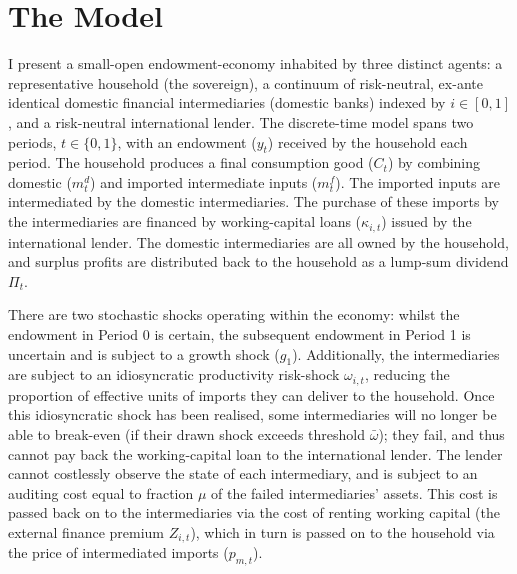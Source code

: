 \documentclass[11pt]{article}
\theoremstyle{definition}
\theoremstyle{plain}
\theoremstyle{remark}
\begin{document}
\section{The Model} \label{sec:environment}

I present a small-open endowment-economy inhabited by three distinct agents: a representative household (the sovereign), a continuum of risk-neutral, ex-ante identical domestic financial intermediaries (domestic banks) indexed by $i \in [0,1]$, and a risk-neutral international lender. The discrete-time model spans two periods, $t \in \{0,1\}$, with an endowment ($y_{t}$) received by the household each period. The household produces a final consumption good ($C_t$) by combining domestic ($m^d_t$) and imported intermediate inputs ($m^f_t$). The imported inputs are intermediated by the domestic intermediaries. The purchase of these imports by the intermediaries are financed by working-capital loans ($\kappa_{i,t}$) issued by the international lender. The domestic intermediaries are all owned by the household, and surplus profits are distributed back to the household as a lump-sum dividend $\Pi_t$. 

There are two stochastic shocks operating within the economy: whilst the endowment in Period 0 is certain, the subsequent endowment in Period 1 is uncertain and is subject to a growth shock ($g_1$). Additionally, the intermediaries are subject to an idiosyncratic productivity risk-shock $\omega_{i,t}$, reducing the proportion of effective units of imports they can deliver to the household. Once this idiosyncratic shock has been realised, some intermediaries will no longer be able to break-even (if their drawn shock exceeds threshold $\bar \omega$); they fail, and thus cannot pay back the working-capital loan to the international lender. The lender cannot costlessly observe the state of each intermediary, and is subject to an auditing cost equal to fraction $\mu$ of the failed intermediaries' assets. This cost is passed back on to the intermediaries via the cost of renting working capital (the external finance premium $Z_{i,t}$), which in turn is passed on to the household via the price of intermediated imports ($p_{m,t}$).
\end{document}
